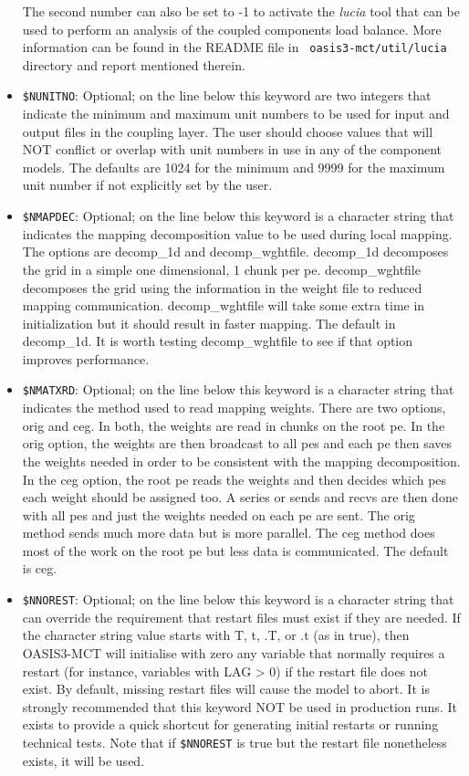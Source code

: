 \begin{itemize}
The second number can also be set to -1 to activate the {\it lucia}
tool that can be used to perform an analysis of the coupled components
load balance. More information can be found in the README file in {\tt
  oasis3-mct/util/lucia} directory and report mentioned therein.
 
\item {\tt \$NUNITNO}: Optional; on the line below this keyword are two integers
  that indicate the minimum and maximum unit numbers to be used for
  input and output files in the coupling layer.  The user should
  choose values that will NOT conflict or overlap with unit numbers in 
  use in any of the component models. The defaults are 1024 for the minimum and 9999
  for the maximum unit number if not explicitly set by the user.

\item {\tt \$NMAPDEC}: Optional; on the line below this keyword is a character string
  that indicates the mapping decomposition value to be used during local mapping.  The
  options are decomp\_1d and decomp\_wghtfile.  decomp\_1d decomposes the grid in a simple
  one dimensional, 1 chunk per pe.  decomp\_wghtfile decomposes the grid using the
  information in the weight file to reduced mapping communication. decomp\_wghtfile
  will take some extra time in initialization but it should result in faster mapping.
  The default in decomp\_1d.  It is worth testing decomp\_wghtfile to see if that
  option improves performance.

\item {\tt \$NMATXRD}: Optional; on the line below this keyword is a character string
  that indicates the method used to read mapping weights.  There are two options, orig
  and ceg.  In both, the weights are read in chunks on the root pe.  In the orig option, 
  the weights are then broadcast to all pes and each pe then saves the weights needed in
  order to be consistent with the mapping decomposition.  In the ceg option, the root pe 
  reads the weights and then decides which pes each weight should be assigned too.  A
  series or sends and recvs are then done with all pes and just the weights needed on
  each pe are sent.  The orig method sends much more data but is more parallel.  The ceg
  method does most of the work on the root pe but less data is communicated.  The default
  is ceg.

\item {\tt \$NNOREST}: Optional; on the line below this keyword is a character
  string that can override the requirement that restart files must exist
  if they are needed.  If the character string value starts with T, t, .T, 
  or .t (as in true), then OASIS3-MCT will initialise with zero any variable that normally requires
  a restart (for instance, variables with LAG > 0) if the restart file does not exist. By default, missing
  restart files will cause the model to abort.  It is strongly recommended
  that this keyword NOT be used in production runs.  It exists to provide a 
  quick shortcut for generating initial restarts or running technical tests. 
  Note that if {\tt \$NNOREST} is true but the restart file nonetheless exists, it will be used.
 

\end{itemize}
